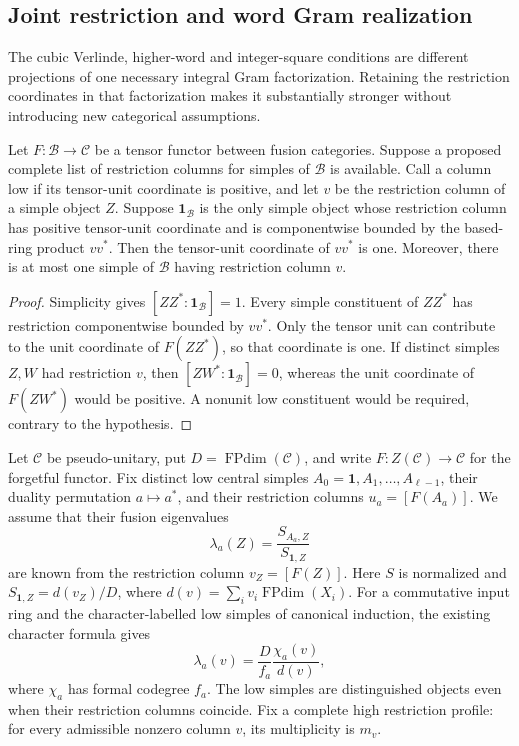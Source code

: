 \subsection{Joint restriction and word Gram realization}
\label{subsec:unified-word-gram}
\label{sec:unified-word-gram}\label{sec:joint-low-product-gram}

The cubic Verlinde, higher-word and integer-square conditions are different
projections of one necessary integral Gram factorization. Retaining the
restriction coordinates in that factorization makes it substantially
stronger without introducing new categorical assumptions.

\begin{lemma}
\label{lem:simple-restriction-support}
Let $F:\mathcal B\to\mathcal C$ be a tensor functor between fusion
categories. Suppose a proposed complete list of restriction columns for
simples of $\mathcal B$ is available. Call a column low if its tensor-unit
coordinate is positive, and let $v$ be the restriction column of a simple
object $Z$. Suppose $\mathbf1_{\mathcal B}$ is the only simple object whose
restriction column has positive tensor-unit coordinate and is
componentwise bounded by the based-ring product $vv^*$.
Then the tensor-unit coordinate of $vv^*$ is one. Moreover, there is at
most one simple of $\mathcal B$ having restriction column $v$.
\end{lemma}
\begin{proof}
Simplicity gives $[ZZ^*: \mathbf1_{\mathcal B}]=1$. Every simple
constituent of $ZZ^*$ has restriction componentwise bounded by $vv^*$.
Only the tensor unit can contribute to the unit coordinate of
$F(ZZ^*)$, so that coordinate is one.
If distinct simples $Z,W$ had restriction $v$, then
$[ZW^*:\mathbf1_{\mathcal B}]=0$, whereas the unit coordinate of
$F(ZW^*)$ would be positive. A nonunit low constituent would be
required, contrary to the hypothesis.
\end{proof}

Let $\mathcal C$ be pseudo-unitary, put $D=\operatorname{FPdim}(\mathcal C)$,
and write $F:Z(\mathcal C)\to\mathcal C$ for the forgetful functor.
Fix distinct low central simples $A_0=\mathbf1,A_1,\ldots,A_{\ell-1}$,
their duality permutation $a\mapsto a^*$, and their restriction columns
$u_a=[F(A_a)]$. We assume that their fusion eigenvalues
\[
 \lambda_a(Z)=\frac{S_{A_a,Z}}{S_{\mathbf1,Z}}
\]
are known from the restriction column $v_Z=[F(Z)]$. Here $S$ is normalized
and $S_{\mathbf1,Z}=d(v_Z)/D$, where
$d(v)=\sum_i v_i\operatorname{FPdim}(X_i)$.
For a commutative input ring and the character-labelled low simples of
canonical induction, the existing character formula gives
\[
 \lambda_a(v)=\frac{D}{f_a}\frac{\chi_a(v)}{d(v)},
\]
where $\chi_a$ has formal codegree $f_a$.
The low simples are distinguished objects even when their restriction
columns coincide. Fix a complete high restriction profile: for every
admissible nonzero column $v$, its multiplicity is $m_v$.

